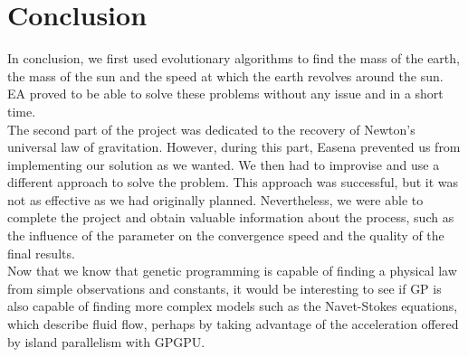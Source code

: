 \section{Conclusion}

In conclusion, we first used evolutionary algorithms to find the mass of the
earth, the mass of the sun and the speed at which the earth revolves around the
sun. EA proved to be able to solve these problems without any issue and in a
short time.\\
The second part of the project was dedicated to the recovery of Newton's
universal law of gravitation. However, during this part, Easena prevented us
from implementing our solution as we wanted. We then had to improvise and use a
different approach to solve the problem. This approach was successful, but it
was not as effective as we had originally planned. Nevertheless, we were able
to complete the project and obtain valuable information about the process, such
as the influence of the parameter on the convergence speed and the quality of
the final results.\\

Now that we know that genetic programming is capable of finding a physical law
from simple observations and constants, it would be interesting to see if GP is
also capable of finding more complex models such as the Navet-Stokes equations,
which describe fluid flow, perhaps by taking advantage of the acceleration
offered by island parallelism with GPGPU.\\